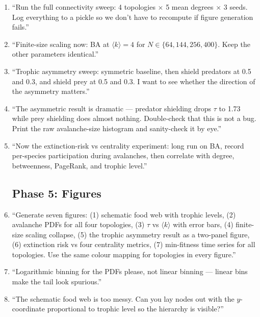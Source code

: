 \documentclass[11pt,a4paper]{article}
\begin{document}
\begin{enumerate}
\subsection*{Phase 4: Experiments}
\item ``Run the full connectivity sweep: 4 topologies $\times$ 5 mean degrees $\times$ 3 seeds. Log everything to a pickle so we don't have to recompute if figure generation fails.''
\item ``Finite-size scaling now: BA at $\langle k \rangle = 4$ for $N \in \{64, 144, 256, 400\}$. Keep the other parameters identical.''
\item ``Trophic asymmetry sweep: symmetric baseline, then shield predators at 0.5 and 0.3, and shield prey at 0.5 and 0.3. I want to see whether the direction of the asymmetry matters.''
\item ``The asymmetric result is dramatic --- predator shielding drops $\tau$ to 1.73 while prey shielding does almost nothing. Double-check that this is not a bug. Print the raw avalanche-size histogram and sanity-check it by eye.''
\item ``Now the extinction-risk vs centrality experiment: long run on BA, record per-species participation during avalanches, then correlate with degree, betweenness, PageRank, and trophic level.''

\subsection*{Phase 5: Figures}
\item ``Generate seven figures: (1) schematic food web with trophic levels, (2) avalanche PDFs for all four topologies, (3) $\tau$ vs $\langle k \rangle$ with error bars, (4) finite-size scaling collapse, (5) the trophic asymmetry result as a two-panel figure, (6) extinction risk vs four centrality metrics, (7) min-fitness time series for all topologies. Use the same colour mapping for topologies in every figure.''
\item ``Logarithmic binning for the PDFs please, not linear binning --- linear bins make the tail look spurious.''
\item ``The schematic food web is too messy. Can you lay nodes out with the $y$-coordinate proportional to trophic level so the hierarchy is visible?''


\end{enumerate}
\end{document}
